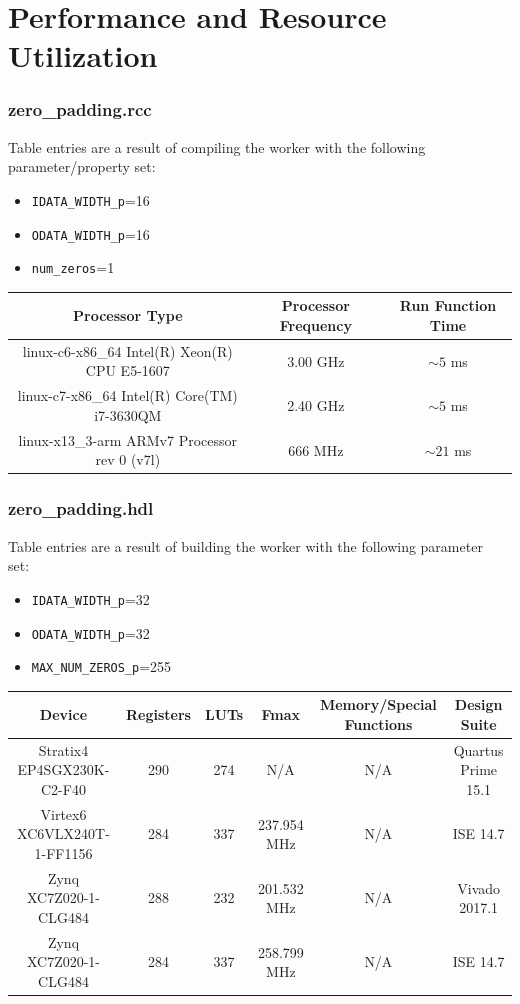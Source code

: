 \documentclass{article}
\def\comp{zero\_padding}
\begin{document}
\section*{Performance and Resource Utilization}
\subsubsection*{\comp.rcc}
Table entries are a result of compiling the worker with the following parameter/property set:\
\begin{itemize}
	\item \verb+IDATA_WIDTH_p+=16
	\item \verb+ODATA_WIDTH_p+=16
	\item \verb+num_zeros+=1
\end{itemize}
\begin{scriptsize}
	\begin{tabular}{|c|c|c|}
		\hline
		\rowcolor{blue}
		Processor Type                                & Processor Frequency & Run Function Time \\
		\hline
		linux-c6-x86\_64 Intel(R) Xeon(R) CPU E5-1607 & 3.00 GHz            & $\sim5$ ms        \\
		\hline
		linux-c7-x86\_64 Intel(R) Core(TM) i7-3630QM  & 2.40 GHz            & $\sim5$ ms        \\
		\hline
		linux-x13\_3-arm ARMv7 Processor rev 0 (v7l)    & 666 MHz             & $\sim21$ ms       \\
		\hline
	\end{tabular}
\end{scriptsize}
\subsubsection*{\comp.hdl}
Table entries are a result of building the worker with the following parameter set:\
\begin{itemize}
	\item \verb+IDATA_WIDTH_p+=32
	\item \verb+ODATA_WIDTH_p+=32
	\item \verb+MAX_NUM_ZEROS_p+=255
\end{itemize}
\begin{scriptsize}
	\begin{tabular}{|c|c|c|c|c|c|}
		\hline
		\rowcolor{blue}
		Device                      & Registers & LUTs & Fmax        & Memory/Special Functions & Design Suite    \\
		\hline
		Stratix4 EP4SGX230K-C2-F40  & 290       & 274  & N/A             & N/A                        & Quartus Prime 15.1 \\
		\hline
		Virtex6 XC6VLX240T-1-FF1156 & 284       & 337  & 237.954 MHz & N/A                        & ISE 14.7        \\
		\hline
		Zynq XC7Z020-1-CLG484       & 288       & 232  & 201.532 MHz & N/A                        & Vivado 2017.1        \\
		\hline
		Zynq XC7Z020-1-CLG484       & 284       & 337  & 258.799 MHz & N/A                        & ISE 14.7        \\
		\hline
	\end{tabular}
\end{scriptsize}
\end{document}
